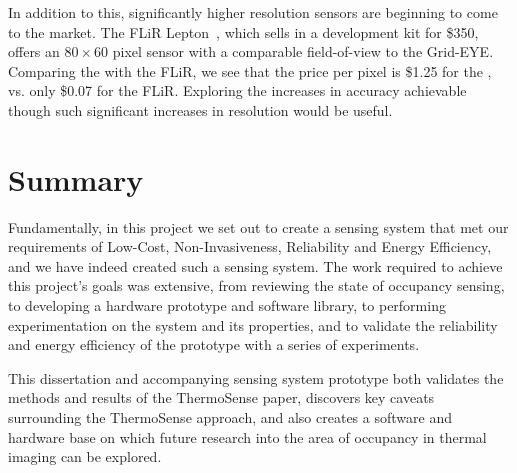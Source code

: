 \documentclass[../thesis/thesis.tex]{subfiles}
\begin{document}
In addition to this, significantly higher resolution sensors are beginning to come to the market. The FLiR Lepton~\cite{flir}, which sells in a development kit for \$350, offers an $80 \times 60$ pixel sensor with a comparable field-of-view to the Grid-EYE. Comparing the \mlx with the FLiR, we see that the price per pixel is \$1.25 for the \mlx, vs. only \$0.07 for the FLiR. Exploring the increases in accuracy achievable though such significant increases in resolution would be useful.

\section{Summary}
Fundamentally, in this project we set out to create a sensing system that met our requirements of Low-Cost, Non-Invasiveness, Reliability and Energy Efficiency, and we have indeed created such a sensing system. The work required to achieve this project's goals was extensive, from reviewing the state of occupancy sensing, to developing a hardware prototype and software library, to performing experimentation on the system and its properties, and to validate the reliability and energy efficiency of the prototype with a series of experiments.

This dissertation and accompanying sensing system prototype both validates the methods and results of the ThermoSense paper, discovers key caveats surrounding the ThermoSense approach, and also creates a software and hardware base on which future research into the area of occupancy in thermal imaging can be explored.
 
\end{document}
